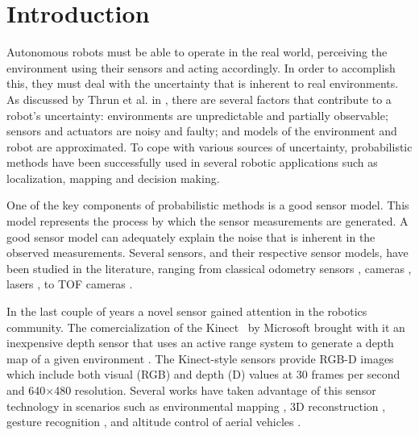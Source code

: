 \section{Introduction} \label{sec:introduction}


Autonomous robots must be able to operate in the real world, perceiving the
environment using their sensors and acting accordingly. In order to accomplish
this, they must deal with the uncertainty that is inherent to real environments.
As discussed by Thrun et al. in \cite{Thrun:2005:PR:1121596}, there are several
factors that contribute to a robot's uncertainty: environments are unpredictable
and partially observable; sensors and actuators are noisy and faulty; and models
of the environment and robot are approximated. To cope with various sources of
uncertainty, probabilistic methods have been successfully used in several
robotic applications such as localization, mapping and decision making.

One of the key components of probabilistic methods is a good sensor model. This
model represents the process by which the sensor measurements are generated. A
good sensor model can adequately explain the noise that is inherent in the
observed measurements. Several sensors, and their respective sensor models, have
been studied in the literature, ranging from classical odometry sensors
\cite{Borenstein95}, cameras \cite{Wu07}\cite{clemente2007mapping}, lasers
\cite{newman2009navigating}, to \ac{TOF} cameras \cite{may2009three}.

In the last couple of years a novel sensor gained attention in the robotics
community. The comercialization of the Kinect\texttrademark ~ by Microsoft
brought with it an inexpensive depth sensor that uses an active range system to
generate a depth map of a given environment \cite{Freedman2008}. The
Kinect-style sensors provide RGB-D images which include both visual (RGB) and
depth (D) values at 30 frames per second and 640$\times$480 resolution. Several
works have taken advantage of this sensor technology in scenarios such as
environmental mapping \cite{henry2012rgb}, 3D reconstruction
\cite{Newcombe2011}, gesture recognition \cite{Xia2011}, and altitude control of
aerial vehicles \cite{Stowers2011}.


